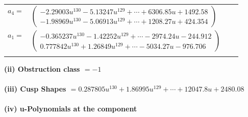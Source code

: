 \documentclass[1p]{elsarticle_modified}
\theoremstyle{definition}
\begin{document}
\begin{tabular}{m{7pt} m{180pt} m{7pt} m{180pt} }
\flushright $a_{4}=$&$\begin{pmatrix}-2.29003 u^{130}-5.13247 u^{129}+\cdots+6306.85 u+1492.58\\-1.98969 u^{130}-5.06913 u^{129}+\cdots+1208.27 u+424.354\end{pmatrix}$ \\
\flushright $a_{1}=$&$\begin{pmatrix}-0.365237 u^{130}-1.42252 u^{129}+\cdots-2974.24 u-244.912\\0.777842 u^{130}+1.26849 u^{129}+\cdots-5034.27 u-976.706\end{pmatrix}$\\&\end{tabular}
\flushleft \textbf{(ii) Obstruction class $= -1$}\\~\\
\flushleft \textbf{(iii) Cusp Shapes $= 0.287805 u^{130}+1.86995 u^{129}+\cdots+12047.8 u+2480.08$}\\~\\
\newpage\renewcommand{\arraystretch}{1}
\flushleft \textbf{(iv) u-Polynomials at the component}\newline \\
\end{document}
